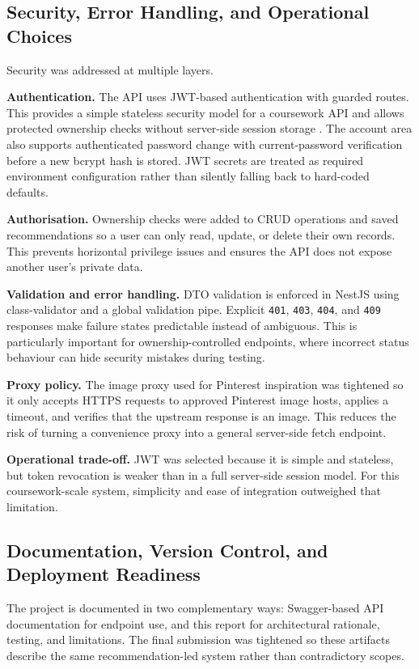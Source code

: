 \documentclass[11pt,a4paper]{article}
\begin{document}
\subsection{Security, Error Handling, and Operational Choices}
Security was addressed at multiple layers.

\textbf{Authentication.} The API uses JWT-based authentication with guarded routes. This provides a simple stateless security model for a coursework API and allows protected ownership checks without server-side session storage \cite{jwt}. The account area also supports authenticated password change with current-password verification before a new bcrypt hash is stored. JWT secrets are treated as required environment configuration rather than silently falling back to hard-coded defaults.

\textbf{Authorisation.} Ownership checks were added to CRUD operations and saved recommendations so a user can only read, update, or delete their own records. This prevents horizontal privilege issues and ensures the API does not expose another user's private data.

\textbf{Validation and error handling.} DTO validation is enforced in NestJS using class-validator and a global validation pipe. Explicit \texttt{401}, \texttt{403}, \texttt{404}, and \texttt{409} responses make failure states predictable instead of ambiguous. This is particularly important for ownership-controlled endpoints, where incorrect status behaviour can hide security mistakes during testing.

\textbf{Proxy policy.} The image proxy used for Pinterest inspiration was tightened so it only accepts HTTPS requests to approved Pinterest image hosts, applies a timeout, and verifies that the upstream response is an image. This reduces the risk of turning a convenience proxy into a general server-side fetch endpoint.

\textbf{Operational trade-off.} JWT was selected because it is simple and stateless, but token revocation is weaker than in a full server-side session model. For this coursework-scale system, simplicity and ease of integration outweighed that limitation.

\subsection{Documentation, Version Control, and Deployment Readiness}
The project is documented in two complementary ways: Swagger-based API documentation for endpoint use, and this report for architectural rationale, testing, and limitations. The final submission was tightened so these artifacts describe the same recommendation-led system rather than contradictory scopes.
\end{document}
